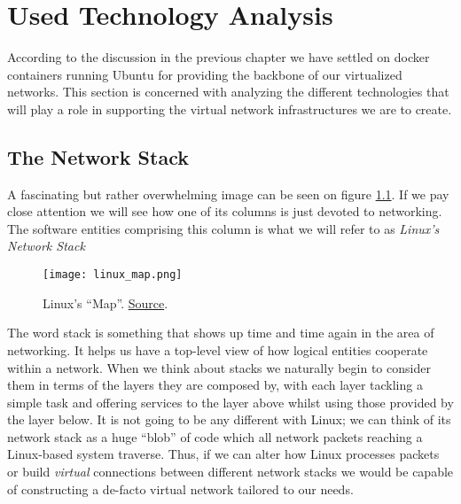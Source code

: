 \chapter{Used Technology Analysis} \label{chap:2}
    According to the discussion in the previous chapter we have settled on docker containers running Ubuntu for providing the backbone of our virtualized networks. This section is concerned with analyzing the different technologies that will play a role in supporting the virtual network infrastructures we are to create.\\

    \section{The Network Stack}
        A fascinating but rather overwhelming image can be seen on figure \ref{fig:linux-map}. If we pay close attention we will see how one of its columns is just devoted to networking. The software entities comprising this column is what we will refer to as \textit{Linux's Network Stack}\\

        \begin{figure}
            \centering
            \texttt{[image: linux\_map.png]}
            \caption{Linux's ``Map''. \href{https://upload.wikimedia.org/wikipedia/commons/5/5b/Linux_kernel_map.png}{Source}.}
            \label{fig:linux-map}
        \end{figure}

         The word stack is something that shows up time and time again in the area of networking. It helps us have a top-level view of how logical entities cooperate within a network. When we think about stacks we naturally begin to consider them in terms of the layers they are composed by, with each layer tackling a simple task and offering services to the layer above whilst using those provided by the layer below. It is not going to be any different with Linux; we can think of its network stack as a huge ``blob'' of code which all network packets reaching a Linux-based system traverse. Thus, if we can alter how Linux processes packets or build \textit{virtual} connections between different network stacks we would be capable of constructing a de-facto virtual network tailored to our needs.\\

